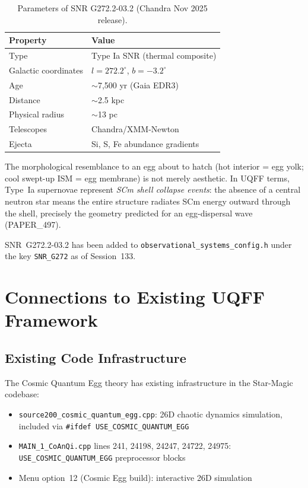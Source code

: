 \documentclass[12pt]{article}
\begin{document}
\begin{table}[h]
\centering
\begin{tabular}{ll}
\toprule
Property & Value \\
\midrule
Type & Type Ia SNR (thermal composite) \\
Galactic coordinates & $l = 272.2^\circ$, $b = -3.2^\circ$ \\
Age & $\sim$7,500 yr (Gaia EDR3) \\
Distance & $\sim$2.5 kpc \\
Physical radius & $\sim$13 pc \\
Telescopes & Chandra/XMM-Newton \\
Ejecta & Si, S, Fe abundance gradients \\
\bottomrule
\end{tabular}
\caption{Parameters of SNR G272.2-03.2 (Chandra Nov 2025 release).}
\end{table}

The morphological resemblance to an egg about to hatch (hot interior = egg
yolk; cool swept-up ISM = egg membrane) is not merely aesthetic. In UQFF
terms, Type~Ia supernovae represent \emph{SCm shell collapse events}: the
absence of a central neutron star means the entire structure radiates SCm
energy outward through the shell, precisely the geometry predicted for an
egg-dispersal wave (PAPER\_497).

SNR~G272.2-03.2 has been added to \texttt{observational\_systems\_config.h}
under the key \texttt{SNR\_G272} as of Session~133.

\section{Connections to Existing UQFF Framework}

\subsection{Existing Code Infrastructure}

The Cosmic Quantum Egg theory has existing infrastructure in the Star-Magic
codebase:

\begin{itemize}
    \item \texttt{source200\_cosmic\_quantum\_egg.cpp}: 26D chaotic dynamics
          simulation, included via \texttt{\#ifdef USE\_COSMIC\_QUANTUM\_EGG}
    \item \texttt{MAIN\_1\_CoAnQi.cpp} lines 241, 24198, 24247, 24722, 24975:
          \texttt{USE\_COSMIC\_QUANTUM\_EGG} preprocessor blocks
    \item Menu option~12 (Cosmic Egg build): interactive 26D simulation
\end{itemize}
\end{document}
